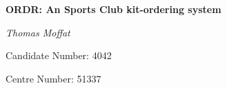 \documentclass[
11pt, %
a4paper, %
oneside, %
headinclude,footinclude, %
BCOR5mm, %
]{scrartcl}
\begin{document}

\renewcommand{\sectionmark}[1]{\markright{\spacedlowsmallcaps{#1}}} %
\lehead{\mbox{\llap{\small\thepage\kern1em\color{halfgray} \vline}\color{halfgray}\hspace{0.5em}\rightmark\hfil}} %

\pagestyle{scrheadings} %


\begin{titlepage}
	\vspace{5cm}
	\centering
	{\huge\bfseries ORDR: An Sports Club kit-ordering system\par}
	\vspace{2cm}
	{\Large\itshape Thomas Moffat\par}
	\vspace{1cm}
	{Candidate Number: 4042\par}
	\vspace{1cm}
	{Centre Number: 51337}
	\vfill
\end{titlepage}

\setcounter{tocdepth}{2} %

\tableofcontents %

\listoffigures





\end{document}
